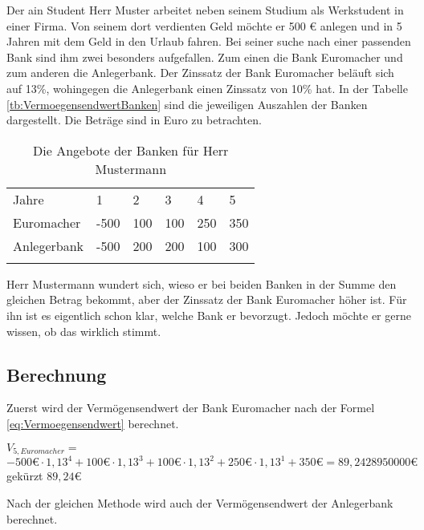 Der \ac{ain} Student Herr Muster arbeitet neben seinem Studium als Werkstudent in einer Firma. Von seinem dort verdienten Geld möchte er 500 € anlegen und in 5 Jahren mit dem Geld in den Urlaub fahren. Bei seiner suche nach einer passenden Bank sind ihm zwei besonders aufgefallen. Zum einen die Bank Euromacher und zum anderen die Anlegerbank. Der Zinssatz der Bank Euromacher beläuft sich auf 13\%, wohingegen die Anlegerbank einen Zinssatz von 10\% hat. In der Tabelle \eqref{tb:VermoegensendwertBanken} sind die jeweiligen Auszahlen der Banken dargestellt. Die Beträge sind in Euro zu betrachten. \pagebreak

\begin{table}[!h]
    \begin{tabular}{llllll}
        \cline{1-6} \rowcolor{gray}
        Jahre       & 1    & 2   & 3   & 4   & 5   \\ \cline{1-6} \rowcolor{white}
        Euromacher  & -500 & 100 & 100 & 250 & 350 \\ \cline{1-6} \rowcolor{white}
        Anlegerbank & -500 & 200 & 200 & 100 & 300 \\ \cline{1-6} \rowcolor{white}
    \end{tabular}
    \caption{Die Angebote der Banken für Herr Mustermann}
    \label{tb:VermoegensendwertBanken}
\end{table}

\noindent
Herr Mustermann wundert sich, wieso er bei beiden Banken in der Summe den gleichen Betrag bekommt, aber der Zinssatz der Bank Euromacher höher ist. Für ihn ist es eigentlich schon klar, welche Bank er bevorzugt. Jedoch möchte er gerne wissen, ob das wirklich stimmt.

\subsection{Berechnung}

Zuerst wird der Vermögensendwert der Bank Euromacher nach der Formel \eqref{eq:Vermoegensendwert} berechnet.

\bigskip
$V_{5, Euromacher} =$\\
\hspace*{10mm}$-500 \text{€} \cdot 1,13^4 + 100 \text{€} \cdot 1,13^3 + 100 \text{€} \cdot 1,13^2 + 250 \text{€} \cdot 1,13^1 + 350 \text{€} = 89,2428950000 \text{€}$\\
\hspace*{10mm}gekürzt $89,24 \text{€}$

\bigskip
\noindent
Nach der gleichen Methode wird auch der Vermögensendwert der Anlegerbank berechnet.

